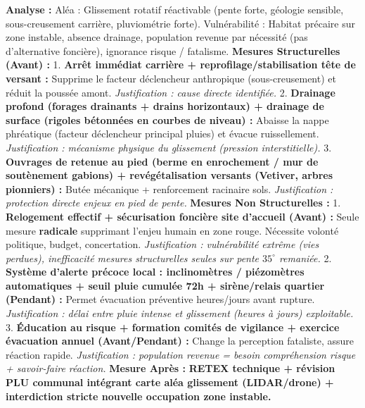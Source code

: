 \documentclass[11pt]{article}
\begin{document}
\begin{corrige}
\textbf{Analyse :} Aléa : Glissement rotatif réactivable (pente forte, géologie sensible, sous-creusement carrière, pluviométrie forte). Vulnérabilité : Habitat précaire sur zone instable, absence drainage, population revenue par nécessité (pas d'alternative foncière), ignorance risque / fatalisme.
\textbf{Mesures Structurelles (Avant) :}
1. \textbf{Arrêt immédiat carrière + reprofilage/stabilisation tête de versant :} Supprime le facteur déclencheur anthropique (sous-creusement) et réduit la poussée amont. \textit{Justification : cause directe identifiée.}
2. \textbf{Drainage profond (forages drainants + drains horizontaux) + drainage de surface (rigoles bétonnées en courbes de niveau) :} Abaisse la nappe phréatique (facteur déclencheur principal pluies) et évacue ruissellement. \textit{Justification : mécanisme physique du glissement (pression interstitielle).}
3. \textbf{Ouvrages de retenue au pied (berme en enrochement / mur de soutènement gabions) + revégétalisation versants (Vetiver, arbres pionniers) :} Butée mécanique + renforcement racinaire sols. \textit{Justification : protection directe enjeux en pied de pente.}
\textbf{Mesures Non Structurelles :}
1. \textbf{Relogement effectif + sécurisation foncière site d'accueil (Avant) :} Seule mesure \textbf{radicale} supprimant l'enjeu humain en zone rouge. Nécessite volonté politique, budget, concertation. \textit{Justification : vulnérabilité extrême (vies perdues), inefficacité mesures structurelles seules sur pente $35^\circ$ remaniée.}
2. \textbf{Système d'alerte précoce local : inclinomètres / piézomètres automatiques + seuil pluie cumulée 72h + sirène/relais quartier (Pendant) :} Permet évacuation préventive heures/jours avant rupture. \textit{Justification : délai entre pluie intense et glissement (heures à jours) exploitable.}
3. \textbf{Éducation au risque + formation comités de vigilance + exercice évacuation annuel (Avant/Pendant) :} Change la perception fataliste, assure réaction rapide. \textit{Justification : population revenue = besoin compréhension risque + savoir-faire réaction.}
\textbf{Mesure Après :} \textbf{RETEX technique + révision PLU communal intégrant carte aléa glissement (LIDAR/drone) + interdiction stricte nouvelle occupation zone instable.}
\end{corrige}
\end{document}
